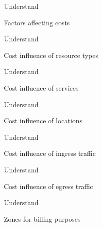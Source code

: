 \documentclass{scrartcl}
\newenvironment{flashcard}[2][]{%
    #1
    \vfill
    \centerline{\Large{#2}}
    \vfill
    \newpage
}
{\newpage}
\begin{document}
    \begin{flashcard}[Understand]{Factors affecting costs}

    \end{flashcard}

    \begin{flashcard}[Understand]{Cost influence of resource types}

    \end{flashcard}

    \begin{flashcard}[Understand]{Cost influence of services}

    \end{flashcard}

    \begin{flashcard}[Understand]{Cost influence of locations}

    \end{flashcard}

    \begin{flashcard}[Understand]{Cost influence of ingress traffic}

    \end{flashcard}

    \begin{flashcard}[Understand]{Cost influence of egress traffic}

    \end{flashcard}

    \begin{flashcard}[Understand]{Zones for billing purposes}

    \end{flashcard}
\end{document}

